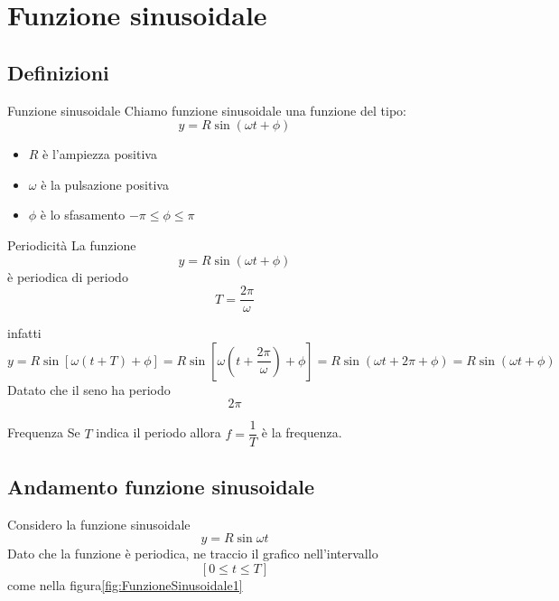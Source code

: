 \chapter{Funzione sinusoidale}
\section{Definizioni}
\label{cha:FunzioneSinusoidale}
\begin{definizionet}{Funzione sinusoidale}{}
	Chiamo funzione sinusoidale una funzione del tipo:
	\[ y=R\sin(\omega t+\phi)\]
	\begin{itemize}
		\item $R$ è l'ampiezza positiva
		\item $\omega$ è la pulsazione positiva
		\item $\phi$ è lo sfasamento $-\pi\leq\phi\leq\pi$
		
	\end{itemize}
\end{definizionet}
\begin{osservazionet}{Periodicità}{}
	La funzione\[ y=R\sin(\omega t+\phi)\]è periodica di periodo\[T=\dfrac{2\pi}{\omega}\]
\end{osservazionet}
infatti\[ y=R\sin[\omega(t+T)+\phi]=R\sin[\omega(t+\dfrac{2\pi}{\omega})+\phi]=R\sin(\omega
t+2\pi+\phi)=R\sin(\omega
t+\phi)\]
Datato che il seno ha periodo \[2\pi\]
\begin{definizionet}{Frequenza}{}
	Se $T$ indica il periodo allora  $f=\dfrac{1}{T}$ è la frequenza.
\end{definizionet}
\section{Andamento funzione sinusoidale}
Considero la funzione sinusoidale\[y=R\sin\omega t\] Dato che la funzione è periodica, ne traccio il grafico nell'intervallo \[[0\leq t\leq T]\] come nella figura\nobs\vref{fig:FunzioneSinusoidale1}

